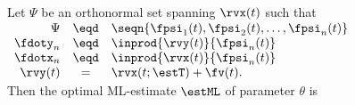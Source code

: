 \begin{theorem}
\label{thm:estML_general}
\label{thm:ml_est_det}
Let $\Psi$ be an orthonormal set spanning $\rvx(t)$ such that
\\\indentx$\begin{array}{rcl}
    \Psi     &\eqd& \seqn{\fpsi_1(t), \fpsi_2(t), \ldots, \fpsi_n(t)}
  \\\fdoty_n &\eqd& \inprod{\rvy(t)}{\fpsi_n(t)}
  \\\fdotx_n &\eqd& \inprod{\rvx(t)}{\fpsi_n(t)}
  \\\rvy(t)  &=   & \rvx(t;\estT) + \fv(t).
\end{array}$
\\
Then the optimal ML-estimate $\estML$ of parameter $\theta$ is
\end{theorem}
